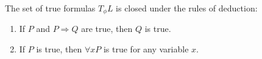 The set of true formulas $T_\phi L$ is closed under the rules of deduction:
\begin{enumerate}
\item {} If $P$ and $P \Rightarrow Q$ are true, then $Q$ is true.
\item {} If $P$ is true, then $\forall x P$ is true for any variable $x$.
\end{enumerate}

